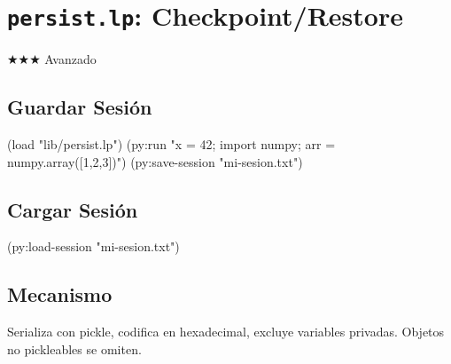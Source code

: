 \chapter{\texttt{persist.lp}: Checkpoint/Restore}
\label{chap:persist}
{\huge$\bigstar$}{\huge$\bigstar$}{\huge$\bigstar$} Avanzado

\section{Guardar Sesión}
\begin{lispcode}
(load "lib/persist.lp")
(py:run "x = 42; import numpy; arr = numpy.array([1,2,3])")
(py:save-session "mi-sesion.txt")
\end{lispcode}

\section{Cargar Sesión}
\begin{lispcode}
(py:load-session "mi-sesion.txt")
\end{lispcode}

\section{Mecanismo}
Serializa con pickle, codifica en hexadecimal, excluye variables privadas.
Objetos no pickleables se omiten.

